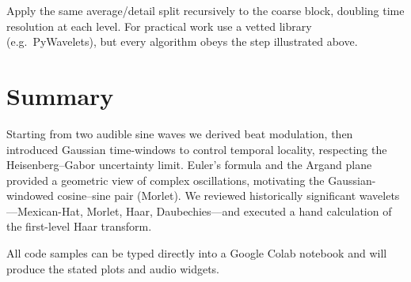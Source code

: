 \documentclass[11pt]{article}
\begin{document}
Apply the same average/detail split recursively to the coarse block,
doubling time resolution at each level.  For practical work use a vetted
library (e.g.\ PyWavelets), but every algorithm obeys the step illustrated above.

\section*{Summary}

Starting from two audible sine waves we derived beat modulation, then
introduced Gaussian time-windows to control temporal locality, respecting
the Heisenberg–Gabor uncertainty limit.  Euler’s formula and the Argand
plane provided a geometric view of complex oscillations, motivating the
Gaussian-windowed cosine–sine pair (Morlet).  We reviewed historically
significant wavelets—Mexican-Hat, Morlet, Haar, Daubechies—and executed a
hand calculation of the first-level Haar transform.

All code samples can be typed directly into a Google Colab notebook and
will produce the stated plots and audio widgets.
\end{document}
